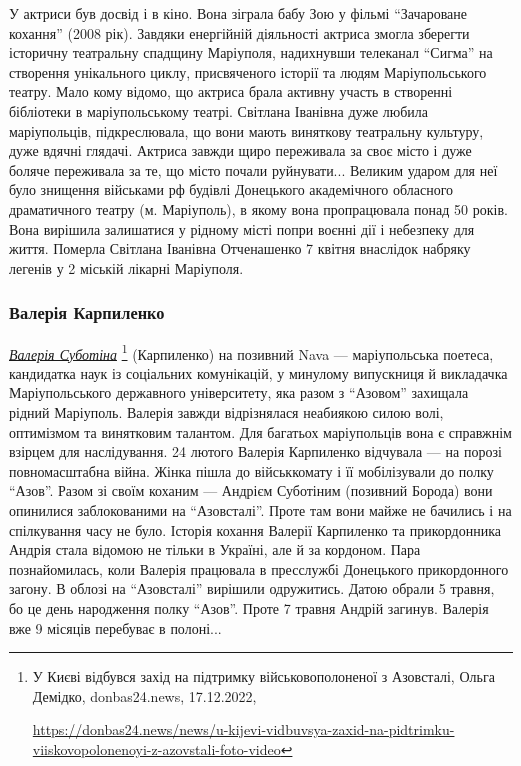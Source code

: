 У актриси був досвід і в кіно. Вона зіграла бабу Зою у фільмі \enquote{Зачароване
кохання} (2008 рік). Завдяки енергійній діяльності актриса змогла зберегти
історичну театральну спадщину Маріуполя, надихнувши телеканал \enquote{Сигма} на
створення унікального циклу, присвяченого історії та людям Маріупольського
театру. Мало кому відомо, що актриса брала активну участь в створенні
бібліотеки в маріупольському театрі. Світлана Іванівна дуже любила
маріупольців, підкреслювала, що вони мають виняткову театральну культуру, дуже
вдячні глядачі. Актриса завжди щиро переживала за своє місто і дуже боляче
переживала за те, що місто почали руйнувати... Великим ударом для неї було
знищення військами рф будівлі Донецького академічного обласного драматичного
театру (м. Маріуполь), в якому вона пропрацювала понад 50 років. Вона вирішила
залишатися у рідному місті попри воєнні дії і небезпеку для життя. Померла
Світлана Іванівна Отченашенко 7 квітня внаслідок набряку легенів у 2 міській
лікарні Маріуполя.

\subsubsection{Валерія Карпиленко}


\href{https://donbas24.news/news/u-kijevi-vidbuvsya-zaxid-na-pidtrimku-viiskovopolonenoyi-z-azovstali-foto-video}{\emph{Валерія Суботіна}}%
\footnote{У Києві відбувся захід на підтримку військовополоненої з Азовсталі, Ольга Демідко, donbas24.news, 17.12.2022, \par\url{https://donbas24.news/news/u-kijevi-vidbuvsya-zaxid-na-pidtrimku-viiskovopolonenoyi-z-azovstali-foto-video}} %
(Карпиленко) на позивний Nava — маріупольська поетеса,
кандидатка наук із соціальних комунікацій, у минулому випускниця й викладачка
Маріупольського державного університету, яка разом з \enquote{Азовом} захищала рідний
Маріуполь. Валерія завжди відрізнялася неабиякою силою волі, оптимізмом та
винятковим талантом. Для багатьох маріупольців вона є справжнім взірцем для
наслідування. 24 лютого Валерія Карпиленко відчувала — на порозі повномасштабна
війна. Жінка пішла до військкомату і її мобілізували до полку \enquote{Азов}. Разом зі
своїм коханим — Андрієм Суботіним (позивний Борода) вони опинилися
заблокованими на \enquote{Азовсталі}. Проте там вони майже не бачились і на спілкування
часу не було. Історія кохання Валерії Карпиленко та прикордонника Андрія стала
відомою не тільки в Україні, але й за кордоном. Пара познайомилась, коли
Валерія працювала в пресслужбі Донецького прикордонного загону. В облозі на
\enquote{Азовсталі} вирішили одружитись. Датою обрали 5 травня, бо це день народження
полку \enquote{Азов}. Проте 7 травня Андрій загинув. Валерія вже 9 місяців перебуває в
полоні...

